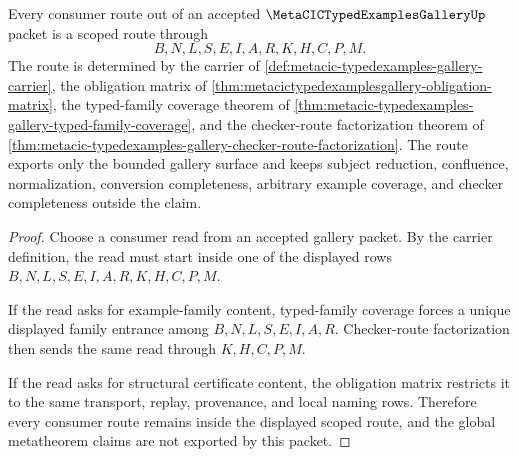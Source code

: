 \begin{theorem}
\label{thm:metacic-typed-examples-gallery-scoped-route}
Every consumer route out of an accepted $\MetaCICTypedExamplesGalleryUp$ packet is a scoped route through
$$
B,N,L,S,E,I,A,R,K,H,C,P,M .
$$
The route is determined by the carrier of \autoref{def:metacic-typedexamples-gallery-carrier}, the obligation matrix of \autoref{thm:metacictypedexamplesgallery-obligation-matrix}, the typed-family coverage theorem of \autoref{thm:metacic-typedexamples-gallery-typed-family-coverage}, and the checker-route factorization theorem of \autoref{thm:metacic-typedexamples-gallery-checker-route-factorization}. The route exports only the bounded gallery surface and keeps subject reduction, confluence, normalization, conversion completeness, arbitrary example coverage, and checker completeness outside the claim.
\end{theorem}
\begin{proof}
Choose a consumer read from an accepted gallery packet. By the carrier definition, the read must start inside one of the displayed rows $B,N,L,S,E,I,A,R,K,H,C,P,M$.

If the read asks for example-family content, typed-family coverage forces a unique displayed family entrance among $B,N,L,S,E,I,A,R$. Checker-route factorization then sends the same read through $K,H,C,P,M$.

If the read asks for structural certificate content, the obligation matrix restricts it to the same transport, replay, provenance, and local naming rows. Therefore every consumer route remains inside the displayed scoped route, and the global metatheorem claims are not exported by this packet.
\end{proof}

